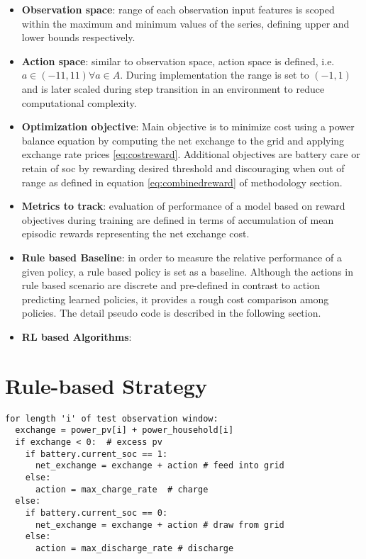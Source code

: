 \begin{large}
\begin{itemize}
	\item \textbf{Observation space}: range of each observation input features is scoped within the maximum and minimum values of the series, defining upper and lower bounds respectively. 
	\item \textbf{Action space}: similar to observation space, action space is defined, i.e. $a \in (-11, 11) \forall a \in A$. During implementation the range is set to $(-1, 1)$ and is later scaled during step transition in an environment to reduce computational complexity.
	\item \textbf{Optimization objective}: Main objective is to minimize cost using a power balance equation by computing the net exchange to the grid and applying exchange rate prices \ref{eq:costreward}. Additional objectives are battery care or retain of soc by rewarding desired threshold and discouraging when out of range as defined in equation \ref{eq:combinedreward} of methodology section.
	\item \textbf{Metrics to track}: evaluation of performance of a model based on reward objectives during training are defined in terms of accumulation of mean episodic rewards representing the net exchange cost.
	\item \textbf{Rule based Baseline}: in order to measure the relative performance of a given policy, a rule based policy is set as a baseline. Although the actions in rule based scenario are discrete and pre-defined in contrast to action predicting learned policies, it provides a rough cost comparison among policies. The detail pseudo code is described in the following section.
	
	\item \textbf{RL based Algorithms}:
\end{itemize}

\section*{Rule-based Strategy}

\begin{lstlisting}
for length 'i' of test observation window:
  exchange = power_pv[i] + power_household[i]
  if exchange < 0:  # excess pv
    if battery.current_soc == 1: 
      net_exchange = exchange + action # feed into grid
    else:
      action = max_charge_rate  # charge
  else:
    if battery.current_soc == 0:
      net_exchange = exchange + action # draw from grid
	else:
	  action = max_discharge_rate # discharge
\end{lstlisting}


\end{large}
